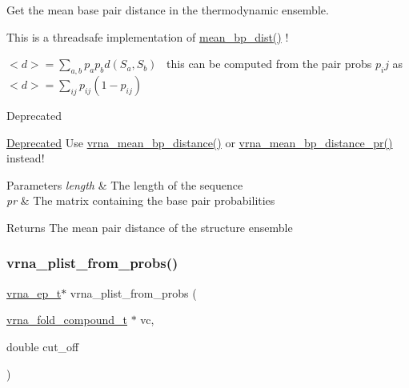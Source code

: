 Get the mean base pair distance in the thermodynamic ensemble. 

This is a threadsafe implementation of \hyperlink{part__func_8h_ae9556ba7ded44fe2321b6f67c3fc02a3}{mean\+\_\+bp\+\_\+dist()} !

$<d> = \sum_{a,b} p_a p_b d(S_a,S_b)$~\newline
this can be computed from the pair probs $p_ij$ as~\newline
 $<d> = \sum_{ij} p_{ij}(1-p_{ij})$

\begin{DoxyRefDesc}{Deprecated}
\item[\hyperlink{deprecated__deprecated000108}{Deprecated}]Use \hyperlink{group__pf__fold_gaa6b8983b559b9ef4b2e1b31113ea317b}{vrna\+\_\+mean\+\_\+bp\+\_\+distance()} or \hyperlink{group__pf__fold_gad3f0c240512e6d43e2e4d4c2076021f5}{vrna\+\_\+mean\+\_\+bp\+\_\+distance\+\_\+pr()} instead!\end{DoxyRefDesc}



\begin{DoxyParams}{Parameters}
{\em length} & The length of the sequence \\
\hline
{\em pr} & The matrix containing the base pair probabilities \\
\hline
\end{DoxyParams}
\begin{DoxyReturn}{Returns}
The mean pair distance of the structure ensemble 
\end{DoxyReturn}
\mbox{\label{group__pf__fold_ga94f6efc0b8d8712b023452794a0a5bd2}} 
\subsubsection{\texorpdfstring{vrna\+\_\+plist\+\_\+from\+\_\+probs()}{vrna\_plist\_from\_probs()}}
{\footnotesize\ttfamily \hyperlink{group__struct__utils_gab9ac98ab55ded9fb90043b024b915aca}{vrna\+\_\+ep\+\_\+t}$\ast$ vrna\+\_\+plist\+\_\+from\+\_\+probs (\begin{DoxyParamCaption}\item[{\hyperlink{group__fold__compound_ga1b0cef17fd40466cef5968eaeeff6166}{vrna\+\_\+fold\+\_\+compound\+\_\+t} $\ast$}]{vc,  }\item[{double}]{cut\+\_\+off }\end{DoxyParamCaption})}



